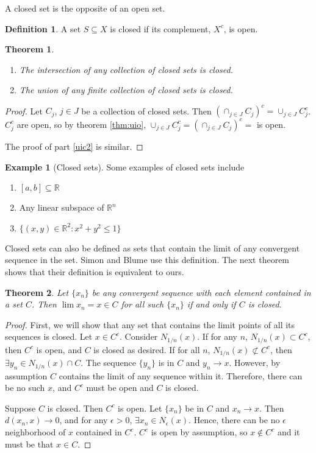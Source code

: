\documentclass[12pt,reqno]{amsart}
\newtheorem{theorem}{Theorem}[section]
\theoremstyle{definition}
\newtheorem{definition}{Definition}[section]
\newtheorem{example}{Example}[section]
\def\R{\mathbb{R}}
\begin{document}
A closed set is the opposite of an open set. 
\begin{definition}
  A set $S \subseteq X$ is closed if its complement, $X^c$, is open. 
\end{definition}
\begin{theorem} $\;$\label{thm:uic}
  \begin{enumerate}
  \item The intersection of any collection of closed sets is closed.
  \item\label{uic2} The union of any finite collection of closed sets is closed. 
  \end{enumerate}
\end{theorem}
\begin{proof}
  Let $C_j$, $j\in J$ be a collection of closed sets. Then 
  $ \left(\cap_{j \in J} C_j\right)^c = \cup_{j \in J}
  C^c_j $. 
  $C^c_j$ are open, so by theorem \ref{thm:uio},  $\cup_{j \in J}
  C^c_j = \left(\cap_{j \in J} C_j\right)^c =$ is open.  
  
  The proof of part \ref{uic2} is similar. 
\end{proof}

\begin{example}[Closed sets]
  Some examples of closed sets include
  \begin{enumerate}
  \item $[a,b] \subseteq \R$
  \item Any linear subspace of $\R^n$
  \item $\{(x,y) \in \R^2: x^2 + y^2 \leq 1\}$
  \end{enumerate}
\end{example}

Closed sets can also be defined as sets that contain the limit of any
convergent sequence in the set. Simon and Blume use this
definition. The next theorem shows that their definition is equivalent
to ours.
\begin{theorem}\label{thm:clim}
  Let $\{x_n\}$ be any convergent sequence with each element contained
  in a set $C$. Then $\lim x_n = x \in C$ for all such $\{x_n\}$ if
  and only if $C$ is closed.
\end{theorem}
\begin{proof}
  First, we will show that any set that contains the limit points of
  all its sequences is closed. Let $x \in C^c$. Consider
  $N_{1/n}(x)$. If for any $n$, $N_{1/n}(x) \subset C^c$, then $C^c$
  is open, and $C$ is closed as desired. If for all $n$, $N_{1/n}(x)
  \not \subset C^c$, then $\exists y_n \in N_{1/n}(x) \cap C$. The
  sequence $\{y_n\}$ is in $C$ and $y_n \to x$. However, by assumption
  $C$ contains the limit of any sequence within it. Therefore, there
  can be no such $x$, and $C^c$ must be open and $C$ is closed.

  Suppose $C$ is closed. Then $C^c$ is open. Let $\{x_n\}$ be in $C$
  and $x_n \to x$. Then $d(x_n, x) \to 0$, and for any $\epsilon > 0$,
  $\exists x_n \in N_\epsilon(x)$. Hence, there can be no $\epsilon$
  neighborhood of $x$ contained in $C^c$. $C^c$ is open by assumption,
  so $x \not\in C^c$ and it must be that $x \in C$. 
\end{proof}
\end{document}
